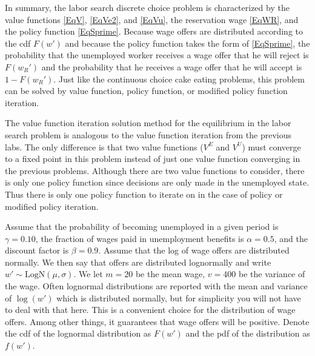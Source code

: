 In summary, the labor search discrete choice problem is characterized by the value functions \eqref{EqV}, \eqref{EqVe2}, and \eqref{EqVu}, the reservation wage \eqref{EqWR}, and the policy function \eqref{EqSprime}. Because wage offers are distributed according to the cdf $F(w')$ and because the policy function takes the form of \eqref{EqSprime}, the probability that the unemployed worker receives a wage offer that he will reject is $F(w_R')$ and the probability that he receives a wage offer that he will accept is $1 - F(w_R')$. Just like the continuous choice cake eating problems, this problem can be solved by value function, policy function, or modified policy function iteration.

The value function iteration solution method for the equilibrium in the labor search problem is analogous to the value function iteration from the previous labs. The only difference is that two value functions ($V^E$ and $V^U$) must converge to a fixed point in this problem instead of just one value function converging in the previous problems.  Although there are two value functions to consider, there is only one policy function since decisions are only made in the unemployed state.  Thus there is only one policy function to iterate on in the case of policy or modified policy iteration.

Assume that the probability of becoming unemployed in a given period is $\gamma = 0.10$, the fraction of wages paid in unemployment benefits is $\alpha = 0.5$, and the discount factor is $\beta = 0.9$. Assume that the log of wage offers are distributed normally.  We then say that offers are distributed lognormally and write $w'\sim \text{LogN}(\mu,\sigma)$.  We let $m=20$ be the mean wage, $v=400$ be the variance of the wage.  Often lognormal distributions are reported with the mean and variance of $\log(w')$ which is distributed normally, but for simplicity you will not have to deal with that here. This is a convenient choice for the distribution of wage offers.  Among other things, it guarantees that wage offers will be positive.  Denote the cdf of the lognormal distribution as $F(w')$ and the pdf of the distribution as $f(w')$.

\newpage


